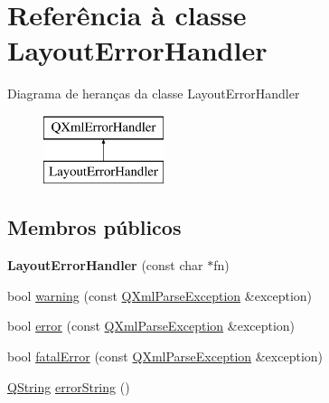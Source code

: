\hypertarget{class_layout_error_handler}{\section{Referência à classe Layout\-Error\-Handler}
\label{class_layout_error_handler}
}
Diagrama de heranças da classe Layout\-Error\-Handler\begin{figure}[H]
\begin{center}
\leavevmode
\includegraphics[height=2.000000cm]{class_layout_error_handler}
\end{center}
\end{figure}
\subsection*{Membros públicos}
\begin{DoxyCompactItemize}
\item 
\hypertarget{class_layout_error_handler_af98df751546e95abc354c3dee545c12a}{{\bfseries Layout\-Error\-Handler} (const char $\ast$fn)}\label{class_layout_error_handler_af98df751546e95abc354c3dee545c12a}

\item 
bool \hyperlink{class_layout_error_handler_aed90bd0b5272f7a5042451fa8f20c5ba}{warning} (const \hyperlink{class_q_xml_parse_exception}{Q\-Xml\-Parse\-Exception} \&exception)
\item 
bool \hyperlink{class_layout_error_handler_a17e6cc63b7ee45c29ef1883227aa3ef8}{error} (const \hyperlink{class_q_xml_parse_exception}{Q\-Xml\-Parse\-Exception} \&exception)
\item 
bool \hyperlink{class_layout_error_handler_afe3fbf09765011104e0d12ee0d395619}{fatal\-Error} (const \hyperlink{class_q_xml_parse_exception}{Q\-Xml\-Parse\-Exception} \&exception)
\item 
\hyperlink{class_q_string}{Q\-String} \hyperlink{class_layout_error_handler_af799a7684337babb971e2e0d8cda7cf1}{error\-String} ()
\end{DoxyCompactItemize}


